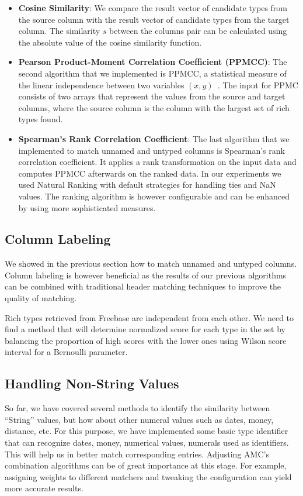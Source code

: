 \documentclass[a4paper,11pt,twoside]{ThesisStyle}
\begin{document}
\begin{itemize}
	\item \textbf{Cosine Similarity}: We compare the result vector of candidate types from the source column with the result vector of candidate types from the target column. The similarity $s$ between the columns pair can be calculated using the absolute value of the cosine similarity function.
	\item \textbf{Pearson Product-Moment Correlation Coefficient (PPMCC)}: The second algorithm that we implemented is PPMCC, a statistical measure of the linear independence between two variables $\left(x,y\right)$~\cite{Kowalski:RoyalStat:72}. The input for PPMC consists of two arrays that represent the values from the source and target columns, where the source column is the column with the largest set of rich types found.
	\item \textbf{Spearman's Rank Correlation Coefficient}: The last algorithm that we implemented to match unnamed and untyped columns is Spearman's rank correlation coefficient. It applies a rank transformation on the input data and computes PPMCC afterwards on the ranked data. In our experiments we used Natural Ranking with default strategies for handling ties and NaN values. The ranking algorithm is however configurable and can be enhanced by using more sophisticated measures.
\end{itemize}

\subsection{Column Labeling}

We showed in the previous section how to match unnamed and untyped columns. Column labeling is however beneficial as the results of our previous algorithms can be combined with traditional header matching techniques to improve the quality of matching.

Rich types retrieved from Freebase are independent from each other. We need to find a method that will determine normalized score for each type in the set by balancing the proportion of high scores with the lower ones using Wilson score interval for a Bernoulli parameter.

\subsection{Handling Non-String Values}

So far, we have covered several methods to identify the similarity between ``String'' values, but how about other numeral values such as dates, money, distance, etc. For this purpose, we have implemented some basic type identifier that can recognize dates, money, numerical values, numerals used as identifiers. This will help us in better match corresponding entries. Adjusting AMC's combination algorithms can be of great importance at this stage. For example, assigning weights to different matchers and tweaking the configuration can yield more accurate results.
\end{document}
